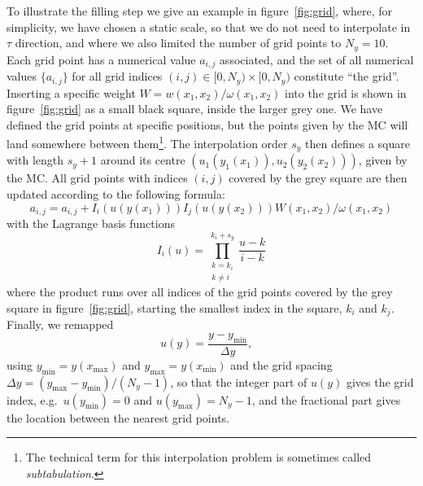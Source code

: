 To illustrate the filling step we give an example in figure~\ref{fig:grid}, where, for simplicity, we have chosen a static scale, so that we do not need to interpolate in $\tau$ direction, and where we also limited the number of grid points to $N_y = 10$.
Each grid point has a numerical value $a_{i,j}$ associated, and the set of all numerical values $\{ a_{i,j} \}$ for all grid indices $(i,j) \in [0,N_y) \times [0,N_y)$ constitute \enquote{the grid}.
Inserting a specific weight $W = w (x_1, x_2) / \omega(x_1, x_2)$ into the grid is shown in figure~\ref{fig:grid} as a small black square, inside the larger grey one.
We have defined the grid points at specific positions, but the points given by the MC will land somewhere between them\footnote{The technical term for this interpolation problem is sometimes called \emph{subtabulation}.}.
The interpolation order $s_y$ then defines a square with length $s_y + 1$ around its centre $(u_1(y_1(x_1)),u_2(y_2(x_2)))$, given by the MC.
All grid points with indices $(i,j)$ covered by the grey square are then updated according to the following formula:
\begin{equation}
a_{i,j} = a_{i,j} + I_i(u(y(x_1))) I_j(u(y(x_2))) W(x_1,x_2) / \omega(x_1,x_2)
\label{eq:interpolation}
\end{equation}
with the Lagrange basis functions
\begin{equation}
I_i (u) = \prod_{\substack{k=k_i \\ k \neq i}}^{k_i + s_y} \frac{u-k}{i-k}
\end{equation}
where the product runs over all indices of the grid points covered by the grey square in figure~\ref{fig:grid}, starting the smallest index in the square, $k_i$ and $k_j$.
Finally, we remapped
\begin{equation}
u(y) = \frac{y-y_\text{min}}{\Delta y} \text{,} \quad
\end{equation}
using $y_\text{min} = y(x_\text{max})$ and $y_\text{max} = y(x_\text{min})$ and the grid spacing $\Delta y = (y_\text{max} - y_\text{min})/(N_y-1)$, so that the integer part of $u(y)$ gives the grid index, e.g.\ $u(y_\text{min}) = 0$ and $u(y_\text{max}) = N_y - 1$, and the fractional part gives the location between the nearest grid points.

